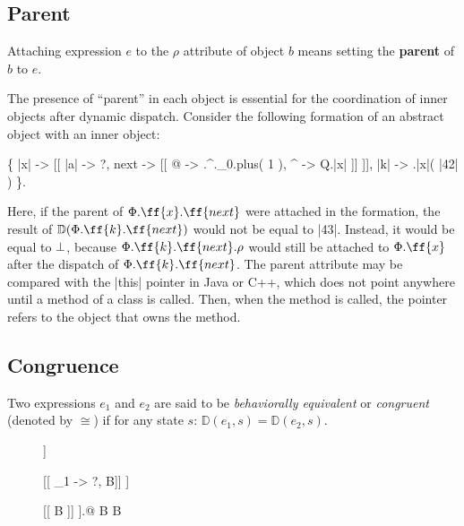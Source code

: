 \subsection{Parent}

\begin{definition}[Parent]
Attaching expression \(e\) to the \(\rho\) attribute of object \(b\)
means setting the \textbf{parent} of \(b\) to \(e\).
\end{definition}

The presence of ``parent'' in each object is essential for the coordination of inner
objects after dynamic dispatch. Consider the following formation of an abstract object
with an inner object:
\begin{phiquation*}
\Big\{ |x| -> [[ |a| -> ?, next -> [[ @ -> \xi.^.\alpha_0.plus( 1 ), ^ -> Q.|x| ]] ]], |k| -> \xi.|x|( |42| ) \Big\}.
\end{phiquation*}
Here, if the parent of \(\Phi.\ff{x}.\ff{next}\) were attached in the formation, the result of \(\mathbb{D}(\Phi.\ff{k}.\ff{next})\)
would not be equal to |43|. Instead, it would be equal to \(\bot\), because \(\Phi.\ff{k}.\ff{next}.\rho\)
would still be attached to \(\Phi.\ff{x}\) after the dispatch of \(\Phi.\ff{k}.\ff{next}\).
The parent attribute may be compared with the |this| pointer in Java or C++, which
does not point anywhere until a method of a class is called. Then, when the method
is called, the  pointer refers to the object that owns the method.

\subsection{Congruence}

Two expressions \(e_1\) and \(e_2\) are said to be \emph{behaviorally equivalent}
or \emph{congruent} (denoted by \(\cong\)) if for any state \(s\): \(\mathbb{D}(e_1, s) = \mathbb{D}(e_2, s)\).

\begin{figure*}
\begin{mdframed}
\begin{phiquation*}
\nf \cong [[ @ -> \nf ]] \quad {}

[[ \tau_1 -> ?, B]] \cong [[ B ]] \quad {}

[[ B ]] \cong [[ B ]].@ \quad{}\;  \in B \;\; \stx{\Delta} \not\in B \quad {}
\end{phiquation*}
\end{mdframed}
\label{fig:congruence}
\end{figure*}

